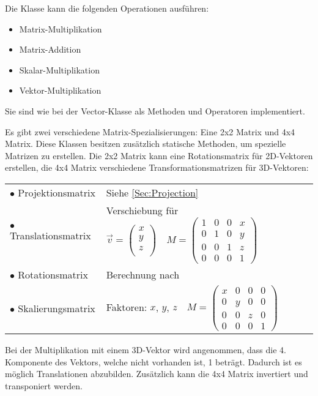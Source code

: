 Die Klasse kann die folgenden Operationen ausführen:
\begin{itemize}
	\item Matrix-Multiplikation
	\item Matrix-Addition
	\item Skalar-Multiplikation
	\item Vektor-Multiplikation
\end{itemize}
Sie sind wie bei der Vector-Klasse als Methoden und Operatoren implementiert.

Es gibt zwei verschiedene Matrix-Spezialisierungen: Eine 2x2 Matrix und 4x4 Matrix.
Diese Klassen besitzen zusätzlich statische Methoden, um spezielle Matrizen zu erstellen. Die 2x2 Matrix kann eine Rotationsmatrix für 2D-Vektoren erstellen, die 4x4 Matrix verschiedene Transformationsmatrizen für 3D-Vektoren:
	\begin{longtable}[l]{ll}
		$\bullet$ Projektionsmatrix & Siehe \cref{Sec:Projection}\\
		$\bullet$ Translationsmatrix & Verschiebung für $\overrightarrow{v} = \begin{pmatrix}
		x \\ y \\ z \\\end{pmatrix} \quad M = \begin{pmatrix}
		1 & 0 & 0 & x \\
		0 & 1 & 0 & y \\
		0 & 0 & 1 & z \\
		0 & 0 & 0 & 1
		\end{pmatrix}$\\
		$\bullet$ Rotationsmatrix & Berechnung nach \cite{WikiRotation}\\
		$\bullet$ Skalierungsmatrix & Faktoren: $x$, $y$, $z \quad M = \begin{pmatrix}
		x & 0 & 0 & 0 \\
		0 & y & 0 & 0 \\
		0 & 0 & z & 0 \\
		0 & 0 & 0 & 1
		\end{pmatrix}$\\
	\end{longtable}

Bei der Multiplikation mit einem 3D-Vektor wird angenommen, dass die 4. Komponente des Vektors, welche nicht vorhanden ist, 1 beträgt. Dadurch ist es möglich Translationen abzubilden. Zusätzlich kann die 4x4 Matrix invertiert und transponiert werden.  

